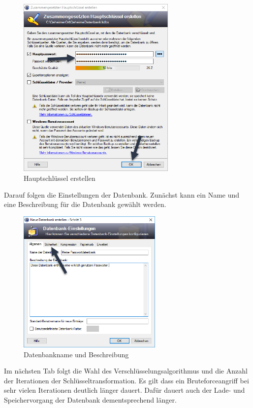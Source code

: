 \documentclass[12pt,a4paper]{scrreprt}
\begin{document}
\begin{figure}[h]
\begin{center}
\includegraphics[width=220pt]{media/knewdb2.png}
\caption{Hauptschlüssel erstellen}
\label{knewdb2}
\end{center}
\end{figure}

\noindent Darauf folgen die Einstellungen der Datenbank. Zunächst kann ein Name und eine Beschreibung für die Datenbank gewählt werden.

\begin{figure}[h]
\begin{center}
\includegraphics[width=200pt]{media/knewdb3.png}
\caption{Datenbankname und Beschreibung}
\label{knewdb3}
\end{center}
\end{figure}

\newpage

\noindent Im nächsten Tab folgt die Wahl des Verschlüsselungsalgorithmus und die Anzahl der Iterationen der Schlüsseltransformation. Es gilt dass ein Bruteforceangriff bei sehr vielen Iterationen deutlich länger dauert. Dafür dauert auch der Lade- und Speichervorgang der Datenbank dementsprechend länger.
\end{document}
